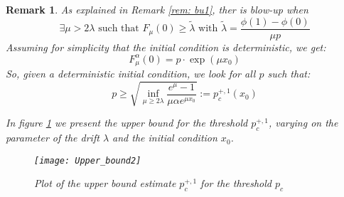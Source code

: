 \documentclass[11pt, a4paper]{article}
\newtheorem{remark}[theorem]{Remark}
\begin{document}
\begin{remark}
As explained in Remark \ref{rem: bu1}, ther is blow-up when
\[\exists \mu>2\lambda\text{ such that }F_\mu(0)\geq \tilde{\lambda}\text{ with }\tilde{\lambda}=\frac{\phi(1)-\phi(0)}{\mu p} \]
Assuming for simplicity that the initial condition is deterministic, we get:
\[F^\alpha_\mu(0)=p\cdot\exp(\mu x_0)\]
So, given a deterministic initial condition, we look for all $p$ such that:
\[p\geq \sqrt{\inf_{\mu\geq 2\lambda}\frac{e^\mu-1}{\mu\alpha e^{\mu x_0}}}:=p^{+,1}_c(x_0)\]

In figure \ref{fig:2} we present the upper bound for the threshold $p^{+,1}_c$, varying on the parameter of the drift $\lambda$ and the initial condition $x_0$.

\begin{figure}\label{fig:2}
\centering
\texttt{[image: Upper\_bound2]}
\caption{Plot of the upper bound estimate $p^{+,1}_c$ for the threshold $p_c$}
\end{figure}
\end{remark}
\end{document}
